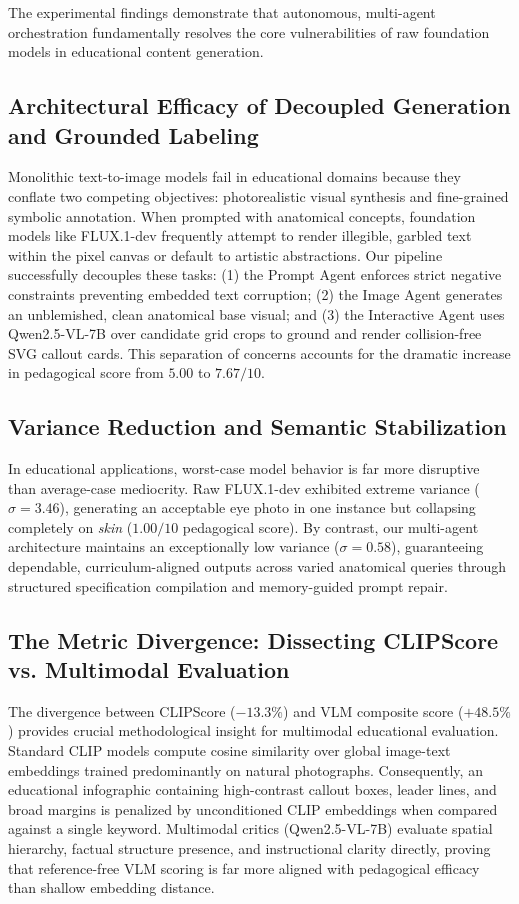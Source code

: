 \documentclass[conference]{IEEEtran}
\begin{document}
The experimental findings demonstrate that autonomous, multi-agent orchestration fundamentally resolves the core vulnerabilities of raw foundation models in educational content generation.

\subsection{Architectural Efficacy of Decoupled Generation and Grounded Labeling}
Monolithic text-to-image models fail in educational domains because they conflate two competing objectives: photorealistic visual synthesis and fine-grained symbolic annotation. When prompted with anatomical concepts, foundation models like FLUX.1-dev frequently attempt to render illegible, garbled text within the pixel canvas or default to artistic abstractions. Our pipeline successfully decouples these tasks: (1) the Prompt Agent enforces strict negative constraints preventing embedded text corruption; (2) the Image Agent generates an unblemished, clean anatomical base visual; and (3) the Interactive Agent uses Qwen2.5-VL-7B over candidate grid crops to ground and render collision-free SVG callout cards. This separation of concerns accounts for the dramatic increase in pedagogical score from $5.00$ to $7.67/10$.

\subsection{Variance Reduction and Semantic Stabilization}
In educational applications, worst-case model behavior is far more disruptive than average-case mediocrity. Raw FLUX.1-dev exhibited extreme variance ($\sigma=3.46$), generating an acceptable eye photo in one instance but collapsing completely on \textit{skin} ($1.00/10$ pedagogical score). By contrast, our multi-agent architecture maintains an exceptionally low variance ($\sigma=0.58$), guaranteeing dependable, curriculum-aligned outputs across varied anatomical queries through structured specification compilation and memory-guided prompt repair.

\subsection{The Metric Divergence: Dissecting CLIPScore vs. Multimodal Evaluation}
The divergence between CLIPScore ($-13.3\%$) and VLM composite score ($+48.5\%$) provides crucial methodological insight for multimodal educational evaluation. Standard CLIP models compute cosine similarity over global image-text embeddings trained predominantly on natural photographs. Consequently, an educational infographic containing high-contrast callout boxes, leader lines, and broad margins is penalized by unconditioned CLIP embeddings when compared against a single keyword. Multimodal critics (Qwen2.5-VL-7B) evaluate spatial hierarchy, factual structure presence, and instructional clarity directly, proving that reference-free VLM scoring is far more aligned with pedagogical efficacy than shallow embedding distance.
\end{document}
